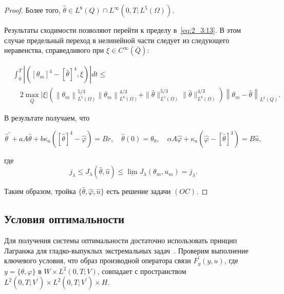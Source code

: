 \begin{proof}
    Более того, $\widehat{\theta} \in L^{8}(Q)
    \cap L^{\infty}\left(0, T ; L^{5}(\Omega)\right)$.

    Результаты сходимости позволяют перейти к пределу в~\eqref{eq:2_3:13}.
    В этом случае предельный переход в
    нелинейной части следует из следующего неравенства,
    справедливого при $\xi \in C^{\infty}(\bar{Q})$:

    \[
        \begin{aligned}
            & \int_{0}^{T}\left|\left(\left[\theta_{m}\right]^{4}
            -[\widehat{\theta}]^{4}, \xi\right)\right| d t \leq \\
            & \quad 2 \max _{\bar{Q}}|\xi|
            \left(\left\|\theta_{m}\right\|_{L^{5}(\Omega)}^{5 / 3}\left\|
            \theta_{m}\right\|_{L^{8}(\Omega)}^{4 / 3}
            + \|\widehat{\theta}\|_{L^{5}(\Omega)}^{5 / 3}
            \|\widehat{\theta}\|_{L^{8}(\Omega)}^{4 / 3}\right)\left\|\theta_{m}
            - \widehat{\theta}\right\|_{L^{2}(Q)}.
        \end{aligned}
    \]


    В результате получаем, что

    \[
        \widehat{\theta}^{\prime}+a A \widehat{\theta}+b
        \kappa_{a}\left([\widehat{\theta}]^{4}-\widehat{\varphi}\right)=B r,
        \quad \widehat{\theta}(0)=\theta_{0},
        \quad \alpha A \widehat{\varphi}+\kappa_{a}\left(\widehat{\varphi}-
        [\widehat{\theta}]^{4}\right)=B \widehat{u},
    \]

    где
    \[
        j_{\lambda} \leq J_{\lambda}(\widehat{\theta},
        \widehat{u}) \leq \underline{\lim }
        J_{\lambda}\left(\theta_{m}, u_{m}\right)=j_{\lambda}.
    \]

    Таким образом, тройка $\{\widehat{\theta}, \widehat{\varphi}, \widehat{u}\}$
    есть решение задачи $(OC)$.
\end{proof}

\subsection{Условия оптимальности}\label{subsec:ch2/sec3/subsec4}
Для получения системы оптимальности достаточно использовать принцип Лагранжа
для гладко-выпуклых экстремальных задач~\cite{10, 11}.
Проверим выполнение ключевого условия,
что образ производной оператора связи $F_{y}^{\prime}(y, u)$,
где $y=\{\theta, \varphi\} \text{ в }  W \times L^{2}(0, T ; V)$,
совпадает с пространством
$L^{2}\left(0, T; V^{\prime}\right) \times L^{2} \left(0, T ; V^{\prime}\right) \times H$.

